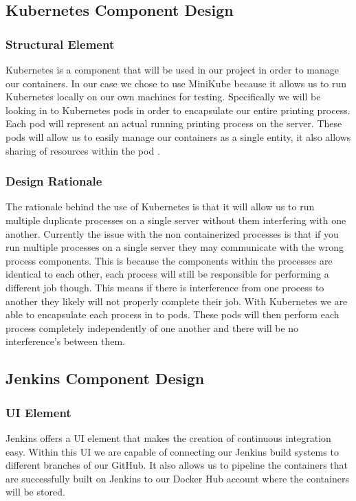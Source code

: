 \documentclass[onecolumn, draftclsnofoot,10pt, compsoc]{IEEEtran}
\begin{document}
\subsection{Kubernetes Component Design}
\subsubsection{Structural Element}
Kubernetes is a component that will be used in our project in order to manage our containers. In our case we chose to use MiniKube because it allows us to run Kubernetes locally on our own machines for testing. Specifically we will be looking in to Kubernetes pods in order to encapsulate our entire printing process. Each pod will represent an actual running printing process on the server. These pods will allow us to easily manage our containers as a single entity, it also allows sharing of resources within the pod \cite{kub}. 
\subsubsection{Design Rationale}
The rationale behind the use of Kubernetes is that it will allow us to run multiple duplicate processes on a single server without them interfering with one another. Currently the issue with the non containerized processes is that if you run multiple processes on a single server they may communicate with the wrong process components. This is because the components within the processes are identical to each other, each process will still be responsible for performing a different job though. This means if there is interference from one process to another they likely will not properly complete their job. With Kubernetes we are able to encapsulate each process in to pods. These pods will then perform each process completely independently of one another and there will be no interference's between them. 

\subsection{Jenkins Component Design}
\subsubsection{UI Element}
Jenkins offers a UI element that makes the creation of continuous integration easy. Within this UI we are capable of connecting our Jenkins build systems to different branches of our GitHub. It also allows us to pipeline the containers that are successfully built on Jenkins to our Docker Hub account where the containers will be stored. 
\end{document}
